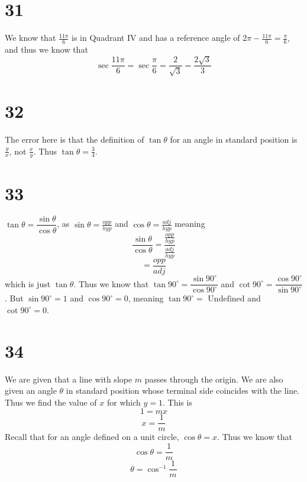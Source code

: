 \documentclass{article}
\theoremstyle{definition}
\newcommand{\?}{\stackrel{?}{=}}
\begin{document}
\section*{31}
We know that $\frac{11\pi}{6}$ is in Quadrant IV and has a reference angle of
$2\pi-\frac{11\pi}{6}=\frac{\pi}{6}$, and thus we know that
\[ \sec\frac{11\pi}{6}=\sec\frac{\pi}{6}=\frac{2}{\sqrt{3}}=\frac{2\sqrt{3}}{3} \]

\section*{32}
The error here is that the definition of $\tan\theta$ for an angle in standard position is $\frac{y}{x}$, not $\frac{x}{y}$. Thus
$\tan\theta=\frac{3}{4}$.

\section*{33}
$\tan\theta=\dfrac{\sin\theta}{\cos\theta}$, as
$\sin\theta=\frac{opp}{hyp}$ and $\cos\theta=\frac{adj}{hyp}$ meaning
\[ \dfrac{\sin\theta}{\cos\theta}=\dfrac{\frac{opp}{hyp}}{\frac{adj}{hyp}} \]
\[ =\frac{opp}{adj} \] which is just $\tan\theta$. Thus we know that $\tan 90^\circ=\dfrac{\sin 90^\circ}{\cos 90^\circ}$ and 
$\cot 90^\circ=\dfrac{\cos 90^\circ}{\sin 90^\circ}$. But $\sin 90^\circ =1$ and $\cos 90^\circ=0$, meaning
$\tan 90^\circ=\textrm{ Undefined}$ and $\cot 90^\circ=0$.

\section*{34}
We are given that a line with slope $m$ passes through the origin. We are also given an angle $\theta$ in standard position whose terminal side coincides with the line. Thus we find the value of $x$ for 
which $y=1$. This is
\[ 1=mx \] \[ x=\frac{1}{m} \] Recall that for an angle defined on a unit circle, $\cos\theta=x$. Thus we know that \[ \cos\theta=\frac{1}{m} \]
\[ \theta=\cos^{-1}\frac{1}{m} \] 
\end{document}
